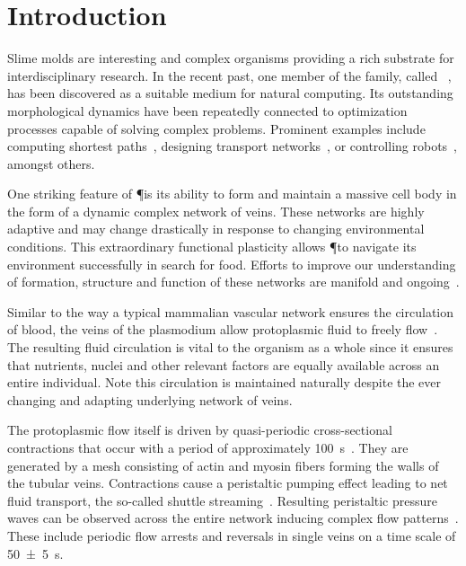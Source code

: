 
\section{Introduction}

  Slime molds are interesting and complex organisms providing a rich substrate for interdisciplinary research. In the recent past, one member of the family, called \Pp~\cite{lifecycle}, has been discovered as a suitable medium for natural computing. Its outstanding morphological dynamics have been repeatedly connected to optimization processes capable of solving complex problems. Prominent examples include computing shortest paths~\cite{nakagaki2000intelligence,Tero2006115,bonifaci2012physarum}, designing transport networks~\cite{tero2010rules,nakagaki2007minimum}, or controlling robots~\cite{tsuda2004robust}, amongst others. 

  One striking feature of \P is its ability to form and maintain a massive cell body in the form of a dynamic complex network of veins. These networks are highly adaptive and may change drastically in response to changing environmental conditions. This extraordinary functional plasticity allows \P to navigate its environment successfully in search for food. Efforts to improve our understanding of formation, structure and function of these networks are manifold and ongoing~\cite{Marwan419,tero2010rules,alim2013random,baumgarten2010plasmodial,baumgarten2013functional}.

  Similar to the way a typical mammalian vascular network ensures the circulation of blood, the veins of the plasmodium allow protoplasmic fluid to freely flow~\cite{kamiya1958studies}. The resulting fluid circulation is vital to the organism as a whole since it ensures that nutrients, nuclei and other relevant factors are equally available across an entire individual. Note this circulation is maintained naturally despite the ever changing and adapting underlying network of veins. 

  The protoplasmic flow itself is driven by quasi-periodic cross-sectional contractions that occur with a period of approximately \SI{100}{\second}~\cite{stewart1959protoplasmic,Wohlfarth-Bottermann15}. They are generated by a mesh consisting of actin and myosin fibers forming the walls of the tubular veins. Contractions cause a peristaltic pumping effect leading to net fluid transport, the so-called shuttle streaming~\cite{kamiya1959motive}. Resulting peristaltic pressure waves can be observed across the entire network inducing complex flow patterns~\cite{nakagaki2000interaction}. These include periodic flow arrests and reversals in single veins on a time scale of \SI{50 \pm 5}{\second}. 

